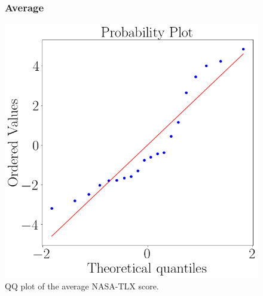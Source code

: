 \begin{figure}[!htb]
    \subsubsection{Average}
        \begin{minipage}{0.45\linewidth}
            \centering
            \includegraphics[width = \linewidth]{Resultados/Nasa/Figuras/png/qqplot_nasa_avg.png}
            \caption{QQ plot of the average NASA-TLX score.}
            \label{fig:qqplot_sdnn_average}
        \end{minipage}
        \begin{minipage}{0.1\linewidth}
            \hfill
        \end{minipage}
        \begin{minipage}{0.45\linewidth}
            \centering

\end{minipage}
\end{figure}
